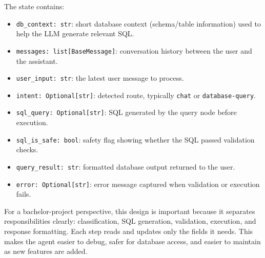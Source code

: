                                                                The state contains:
                                                                \begin{itemize}[noitemsep]
                                                                    \item \texttt{db\_context: str}: short database context (schema/table information) used to help the LLM generate relevant SQL.
                                                                        \item \texttt{messages: list[BaseMessage]}: conversation history between the user and the assistant.
                                                                            \item \texttt{user\_input: str}: the latest user message to process.
                                                                                \item \texttt{intent: Optional[str]}: detected route, typically \texttt{chat} or \texttt{database-query}.
                                                                                    \item \texttt{sql\_query: Optional[str]}: SQL generated by the query node before execution.
                                                                                        \item \texttt{sql\_is\_safe: bool}: safety flag showing whether the SQL passed validation checks.
                                                                                            \item \texttt{query\_result: str}: formatted database output returned to the user.
                                                                                                \item \texttt{error: Optional[str]}: error message captured when validation or execution fails.
                                                                                                \end{itemize}

                                                                                                For a bachelor-project perspective, this design is important because it separates responsibilities clearly: classification, SQL generation, validation, execution, and response formatting. Each step reads and updates only the fields it needs. This makes the agent easier to debug, safer for database access, and easier to maintain as new features are added.

